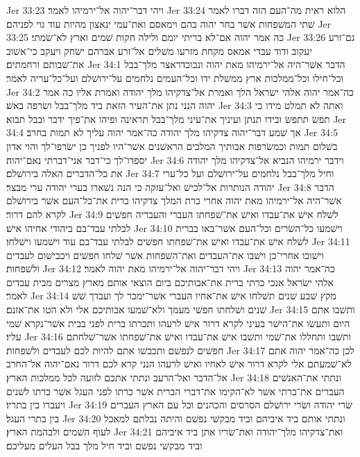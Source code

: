 Jer 33:23  ויהי דבר־יהוה אל־ירמיהו לאמר׃
Jer 33:24  הלוא ראית מה־העם הזה דברו לאמר שׁתי המשׁפחות אשׁר בחר יהוה בהם וימאסם ואת־עמי ינאצון מהיות עוד גוי לפניהם׃
Jer 33:25  כה אמר יהוה אם־לא בריתי יומם ולילה חקות שׁמים וארץ לא־שׂמתי׃
Jer 33:26  גם־זרע יעקוב ודוד עבדי אמאס מקחת מזרעו משׁלים אל־זרע אברהם ישׂחק ויעקב כי־אשׁוב את־שׁבותם ורחמתים׃
Jer 34:1  הדבר אשׁר־היה אל־ירמיהו מאת יהוה ונבוכדראצר מלך־בבל וכל־חילו וכל־ממלכות ארץ ממשׁלת ידו וכל־העמים נלחמים על־ירושׁלם ועל־כל־עריה לאמר׃
Jer 34:2  כה־אמר יהוה אלהי ישׂראל הלך ואמרת אל־צדקיהו מלך יהודה ואמרת אליו כה אמר יהוה הנני נתן את־העיר הזאת ביד מלך־בבל ושׂרפה באשׁ׃
Jer 34:3  ואתה לא תמלט מידו כי תפשׂ תתפשׂ ובידו תנתן ועיניך את־עיני מלך־בבל תראינה ופיהו את־פיך ידבר ובבל תבוא׃
Jer 34:4  אך שׁמע דבר־יהוה צדקיהו מלך יהודה כה־אמר יהוה עליך לא תמות בחרב׃
Jer 34:5  בשׁלום תמות וכמשׂרפות אבותיך המלכים הראשׁנים אשׁר־היו לפניך כן ישׂרפו־לך והוי אדון יספדו־לך כי־דבר אני־דברתי נאם־יהוה׃
Jer 34:6  וידבר ירמיהו הנביא אל־צדקיהו מלך יהודה את כל־הדברים האלה בירושׁלם׃
Jer 34:7  וחיל מלך־בבל נלחמים על־ירושׁלם ועל כל־ערי יהודה הנותרות אל־לכישׁ ואל־עזקה כי הנה נשׁארו בערי יהודה ערי מבצר׃
Jer 34:8  הדבר אשׁר־היה אל־ירמיהו מאת יהוה אחרי כרת המלך צדקיהו ברית את־כל־העם אשׁר בירושׁלם לקרא להם דרור׃
Jer 34:9  לשׁלח אישׁ את־עבדו ואישׁ את־שׁפחתו העברי והעבריה חפשׁים לבלתי עבד־בם ביהודי אחיהו אישׁ׃
Jer 34:10  וישׁמעו כל־השׂרים וכל־העם אשׁר־באו בברית לשׁלח אישׁ את־עבדו ואישׁ את־שׁפחתו חפשׁים לבלתי עבד־בם עוד וישׁמעו וישׁלחו׃
Jer 34:11  וישׁובו אחרי־כן וישׁבו את־העבדים ואת־השׁפחות אשׁר שׁלחו חפשׁים ויכבישׁום לעבדים ולשׁפחות׃
Jer 34:12  ויהי דבר־יהוה אל־ירמיהו מאת יהוה לאמר׃
Jer 34:13  כה־אמר יהוה אלהי ישׂראל אנכי כרתי ברית את־אבותיכם ביום הוצאי אותם מארץ מצרים מבית עבדים לאמר׃
Jer 34:14  מקץ שׁבע שׁנים תשׁלחו אישׁ את־אחיו העברי אשׁר־ימכר לך ועבדך שׁשׁ שׁנים ושׁלחתו חפשׁי מעמך ולא־שׁמעו אבותיכם אלי ולא הטו את־אזנם׃
Jer 34:15  ותשׁבו אתם היום ותעשׂו את־הישׁר בעיני לקרא דרור אישׁ לרעהו ותכרתו ברית לפני בבית אשׁר־נקרא שׁמי עליו׃
Jer 34:16  ותשׁבו ותחללו את־שׁמי ותשׁבו אישׁ את־עבדו ואישׁ את־שׁפחתו אשׁר־שׁלחתם חפשׁים לנפשׁם ותכבשׁו אתם להיות לכם לעבדים ולשׁפחות׃
Jer 34:17  לכן כה־אמר יהוה אתם לא־שׁמעתם אלי לקרא דרור אישׁ לאחיו ואישׁ לרעהו הנני קרא לכם דרור נאם־יהוה אל־החרב אל־הדבר ואל־הרעב ונתתי אתכם לזועה לכל ממלכות הארץ׃
Jer 34:18  ונתתי את־האנשׁים העברים את־ברתי אשׁר לא־הקימו את־דברי הברית אשׁר כרתו לפני העגל אשׁר כרתו לשׁנים ויעברו בין בתריו׃
Jer 34:19  שׂרי יהודה ושׂרי ירושׁלם הסרסים והכהנים וכל עם הארץ העברים בין בתרי העגל׃
Jer 34:20  ונתתי אותם ביד איביהם וביד מבקשׁי נפשׁם והיתה נבלתם למאכל לעוף השׁמים ולבהמת הארץ׃
Jer 34:21  ואת־צדקיהו מלך־יהודה ואת־שׂריו אתן ביד איביהם וביד מבקשׁי נפשׁם וביד חיל מלך בבל העלים מעליכם׃
